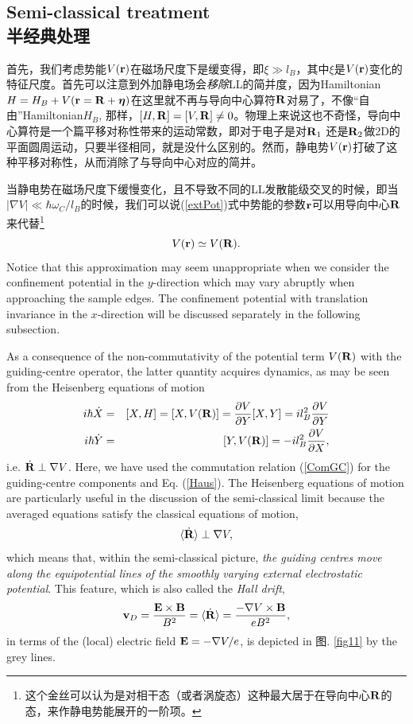 \documentclass[10pt]{book}
\newcommand{\etab}{\mbox{\boldmath $\eta $}}
\newcommand{\br}{{\bf r}}
\newcommand{\bR}{{\bf R}}
\newcommand{\bB}{{\bf B}}
\newcommand{\bE}{{\bf E}}
\newcommand{\beq}{\begin{equation}}
\newcommand{\beqn}{\begin{eqnarray}}
\newcommand{\eeq}{\end{equation}}
\newcommand{\eeqn}{\end{eqnarray}}
\newcommand{\nn}{\nonumber}
\begin{document}
\subsection[半经典处理]{Semi-classical treatment\\\bf 半经典处理}

首先，我们考虑势能$V(\br)$在磁场尺度下是缓变得，即$\xi\gg l_B$，其中$\xi$是$V(\br)$变化的特征尺度。首先可以注意到外加静电场会{\sl 移除}LL的简并度，因为Hamiltonian $H=H_B+V(\br=\bR +\etab)$在这里就不再与导向中心算符$\bR$对易了，不像``自由''Hamiltonian$H_B$, 那样，$[H,\bR]=[V,\bR]\neq 0$。物理上来说这也不奇怪，导向中心算符是一个篇平移对称性带来的运动常数，即对于电子是对$\bR_1$
还是$\bR_2$做2D的平面圆周运动，只要半径相同，就是没什么区别的。然而，静电势$V(\br)$打破了这种平移对称性，从而消除了与导向中心对应的简并。

当静电势在磁场尺度下缓慢变化，且不导致不同的LL发散能级交叉的时候，即当$|\nabla V| \ll \hbar \omega_C/l_B$的时候，我们可以说(\ref{extPot})式中势能的参数$\br$可以用导向中心$\bR$来代替\footnote{这个金丝可以认为是对相干态（或者涡旋态）这种最大居于在导向中心$\bR$的态，来作静电势能展开的一阶项\cite{champel}。} 
\beq\label{GCpotential}
V(\br)\simeq V(\bR). 
\eeq
Notice that this approximation may seem unappropriate
when we consider the confinement potential in the $y$-direction which may vary abruptly when approaching the sample edges.
The confinement potential with translation invariance in the $x$-direction will be discussed separately in the following subsection.

As a consequence of the non-commutativity of the potential term $V(\bR)$ with the guiding-centre operator, the latter 
quantity acquires dynamics, as may be seen from the Heisenberg equations of motion
\beqn\label{HeisenbergEM}
\nn
i\hbar \dot{X} &=& [X,H] = [X,V(\bR)] = \frac{\partial V}{\partial Y}[X,Y] = il_B^2 \frac{\partial V}{\partial Y}\\
i\hbar \dot{Y} &=& [Y,V(\bR)] = - il_B^2\frac{\partial V}{\partial X},
\eeqn
i.e. $\dot{\bR} \perp \nabla V$. Here, we have used the commutation relation (\ref{ComGC}) for the guiding-centre components
and Eq. (\ref{Haus}). The Heisenberg equations of motion are particularly useful in the discussion of the semi-classical limit
because the averaged equations satisfy the classical equations of motion,
\beq\label{SemCl}
\langle \dot{\bR}\rangle \perp \nabla V,
\eeq
which means that, within the semi-classical picture, {\sl the guiding centres move along the equipotential lines of the 
smoothly varying external electrostatic potential}. This feature, which is also called the {\sl Hall drift}, 
\beq\label{HallDrift}
{\bf v}_D=\frac{\bE\times\bB}{B^2} = \langle \dot{\bR}\rangle = \frac{-\nabla V \times \bB}{eB^2},
\eeq
in terms of the (local) electric field $\bE=-\nabla V/e$,
is depicted in 图. \ref{fig11} by the grey lines. 
\end{document}

